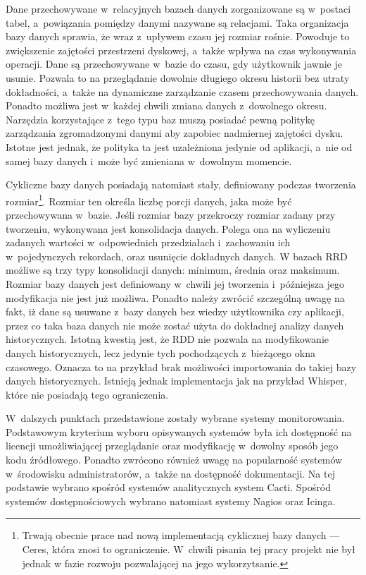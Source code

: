 Dane przechowywane w~relacyjnych bazach danych zorganizowane są
w~postaci tabel, a~powiązania pomiędzy danymi nazywane są
relacjami. Taka organizacja bazy danych sprawia, że wraz z~upływem
czasu jej rozmiar rośnie. Powoduje to zwiększenie zajętości
przestrzeni dyskowej, a~także wpływa na czas wykonywania
operacji. Dane są przechowywane w~bazie do czasu, gdy użytkownik
jawnie je usunie. Pozwala to na przeglądanie dowolnie długiego okresu
historii bez utraty dokładności, a~także na dynamiczne zarządzanie
czasem przechowywania danych. Ponadto możliwa jest w~każdej chwili
zmiana danych z~dowolnego okresu. Narzędzia korzystające z~tego typu
baz muszą posiadać pewną politykę zarządzania zgromadzonymi danymi aby
zapobiec nadmiernej zajętości dysku. Istotne jest jednak, że polityka
ta jest uzależniona jedynie od aplikacji, a~nie od samej bazy danych
i~może być zmieniana w~dowolnym momencie.

Cykliczne bazy danych posiadają natomiast stały, definiowany podczas
tworzenia rozmiar\footnote{Trwają obecnie prace nad nową implementacją
  cyklicznej bazy danych --- Ceres\cite{www:Ceres}, która znosi to
  ograniczenie. W~chwili pisania tej pracy projekt nie był jednak w
  fazie rozwoju pozwalającej na jego wykorzytsanie.}. Rozmiar ten
określa liczbę porcji danych, jaka może być przechowywana
w~bazie. Jeśli rozmiar bazy przekroczy rozmiar zadany przy tworzeniu,
wykonywana jest konsolidacja danych. Polega ona na wyliczeniu zadanych
wartości w~odpowiednich przedziałach i~zachowaniu ich w~pojedynczych
rekordach, oraz usunięcie dokładnych danych. W bazach RRD możliwe są
trzy typy konsolidacji danych: minimum, średnia oraz maksimum. Rozmiar
bazy danych jest definiowany w~chwili jej tworzenia i~późniejsza jego
modyfikacja nie jest już możliwa. Ponadto należy zwrócić szczególną
uwagę na fakt, iż dane są usuwane z~bazy danych bez wiedzy użytkownika
czy aplikacji, przez co taka baza danych nie może zostać użyta do
dokładnej analizy danych historycznych. Istotną kwestią jest, że RDD
nie pozwala na modyfikowanie danych historycznych, lecz jedynie tych
pochodzących z~bieżącego okna czasowego. Oznacza to na przykład brak
możliwości importowania do takiej bazy danych historycznych. Istnieją
jednak implementacja jak na przykład Whisper, które nie posiadają tego
ograniczenia.

W~dalszych punktach przedstawione zostały wybrane systemy
monitorowania. Podstawowym kryterium wyboru opisywanych systemów była
ich dostępność na licencji umożliwiającej przeglądanie oraz
modyfikację w~dowolny sposób jego kodu źródłowego. Ponadto zwrócono
również uwagę na popularność systemów w~środowisku administratorów,
a~także na dostępność dokumentacji. Na tej podstawie wybrano spośród
systemów analitycznych system Cacti. Spośród systemów dostępnościowych
wybrano natomiast systemy Nagios oraz Icinga.


